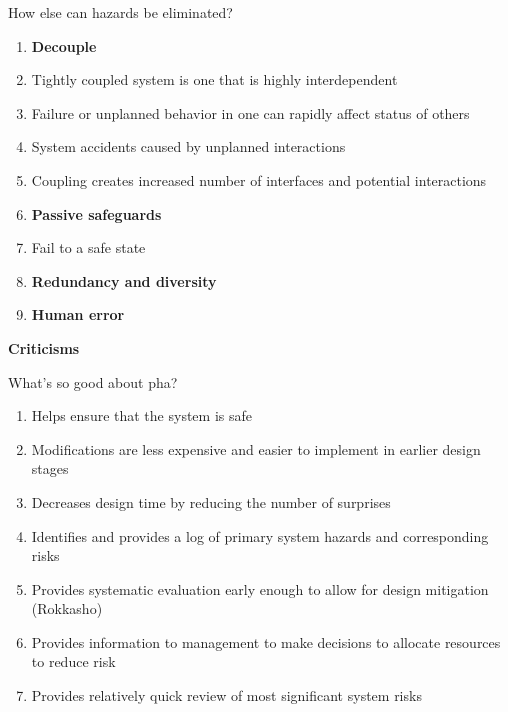 \documentclass[aspectratio=1610,pdftex,dvipsnames,compress,xcolor={dvipsnames}]{beamer}
\newcommand{\acs}{\acrshort} %
\begin{document}
\begin{frame}{How else can hazards be eliminated?}
    \begin{enumerate}[series=outerlist,topsep=0pt,itemsep=1pt,leftmargin=*,label=(\arabic*)]
        \item[]\textbf{Decouple}
        \item[]Tightly coupled system is one that is highly interdependent  
        \item[]Failure or unplanned behavior in one can rapidly affect status of others  
        \item[]System accidents caused by unplanned interactions  
        \item[]Coupling creates increased number of interfaces and potential interactions
            \vspace{0.15in}
        \item[]\textbf{Passive safeguards}
        \item[]Fail to a safe state
            \vspace{0.15in}
        \item[]\textbf{Redundancy and diversity}
            \vspace{0.15in}
        \item[]\textbf{Human error}
    \end{enumerate}
\end{frame}


\begin{frame}[plain]{}
    \centering\LARGE\textbf{Criticisms}
\end{frame}


\addtocounter{framenumber}{-1}
\begin{frame}{What's so good about \acs{pha}?}
    \begin{enumerate}[series=outerlist,topsep=0pt,itemsep=15pt,leftmargin=*,label=(\arabic*)]
        \item[]Helps ensure that the system is safe
        \item[]Modifications are less expensive and easier to implement in earlier design stages  
        \item[]Decreases design time by reducing the number of surprises  
        \item[]Identifies and provides a log of primary system hazards and corresponding risks
        \item[]Provides systematic evaluation early enough to allow for design mitigation (Rokkasho)
        \item[]Provides information to management to make decisions to allocate resources to reduce risk
        \item[]Provides relatively quick review of most significant system risks
    \end{enumerate}
\end{frame}
\end{document}
